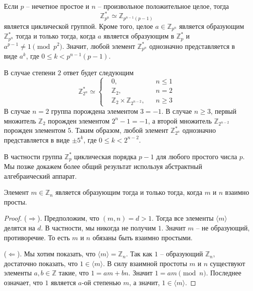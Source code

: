 \begin{claim}
Если $p$ -- нечетное простое и $n$ -- произвольное положительное целое, тогда
\[
\mathbb Z_{p^n}^* \simeq \mathbb Z_{p^{n-1}(p-1)}
\]
является циклической группой. Кроме того, целое $a\in \mathbb Z_{p^n}$ является образующим $\mathbb Z_{p^n}^* $ тогда и только тогда, когда $a$ является образующим в $\mathbb Z_p^*$ и $a^{p-1}\neq 1 \pmod{ p^2}$. Значит, любой элемент $\mathbb Z_{p^n}^*$ однозначно представляется в виде $a^k$, где $0\leqslant k < p^{n-1}(p-1)$.

В случае степени $2$ ответ будет следующим
\[
\mathbb Z_{2^n}^*\simeq
\left\{
\begin{aligned}
&0, & &n\leqslant 1\\
&\mathbb Z_2, & &n = 2\\
&\mathbb Z_2\times \mathbb Z_{2^{n-2}}, & &n\geqslant 3
\end{aligned}
\right.
\]
В случае $n = 2$ группа порождена элементом $3 = -1$. В случае $n \geqslant 3$, первый множитель $\mathbb Z_2$ порожден элементом $2^n - 1 = -1$, а второй множитель $\mathbb Z_{2^{n-2}}$ порожден элементом $5$. Таким образом, любой элемент $\mathbb Z_{2^n}^*$ однозначно представляется в виде $\pm 5^k$, где $0\leqslant k < 2^{n-2}$.
\end{claim}

В частности группа $\mathbb Z_p^*$ циклическая порядка $p-1$ для любого простого числа $p$. Мы позже докажем более общий результат используя абстрактный алгебраический аппарат.

\begin{claim}
Элемент $m\in \mathbb Z_n$ является образующим тогда и только тогда, когда $m$ и $n$ взаимно просты.
\end{claim}
\begin{proof}
($\Rightarrow$). Предположим, что $(m, n) = d > 1$. Тогда все элементы $\langle m\rangle$ делятся на $d$. В частности, мы никогда не получим $1$. Значит $m$ -- не образующий, противоречие. То есть $m$ и $n$ обязаны быть взаимно простыми.

($\Leftarrow$). Мы хотим показать, что $\langle m\rangle = \mathbb Z_n$. Так как $1$ -- образующий $\mathbb Z_n$, достаточно показать, что $1\in \langle m\rangle$. В силу взаимной простоты $m$ и $n$ существуют элементы  $a, b\in \mathbb Z$ такие, что $1 = a m + b n$. Значит $1 = a m \pmod n$. Последнее означает, что $1$ является $a$-ой степенью $m$, а значит, $1 \in \langle m \rangle$.
\end{proof}


